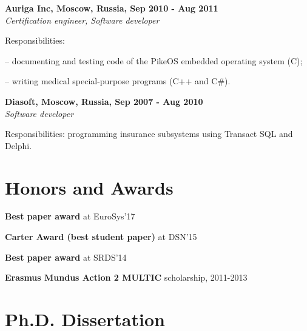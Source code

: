 \documentclass[letterpaper]{article}
\renewenvironment{itemize}{
  \begin{list}{}{
    \setlength{\leftmargin}{1.5em}
  }
}{
  \end{list}
}
\begin{document}
\vspace{2mm}

{\bf Auriga Inc, Moscow, Russia, Sep 2010 - Aug 2011}\\
{\em Certification engineer, Software developer}
\begin{itemize}
    \vspace{-2mm}
	\item Responsibilities:
		\begin{itemize}
		\item -- documenting and testing code of the PikeOS embedded operating system (C);
		\item -- writing medical special-purpose programs (C++ and C\#).
		\end{itemize}
	\item 
\end{itemize}

\vspace{2mm}

{\bf Diasoft, Moscow, Russia, Sep 2007 - Aug 2010}\\
{\em Software developer}
\begin{itemize}
    \vspace{-2mm}
	\item Responsibilities: programming insurance subsystems using Transact SQL and Delphi.
\end{itemize}


\section*{Honors and Awards}

\begin{itemize}
\item \textbf{Best paper award} at EuroSys'17
\item \textbf{Carter Award (best student paper)} at DSN'15
\item \textbf{Best paper award} at SRDS'14
\item \textbf{Erasmus Mundus Action 2 MULTIC} scholarship, 2011-2013

\end{itemize}


\section* {Ph.D. Dissertation}
\end{document}
